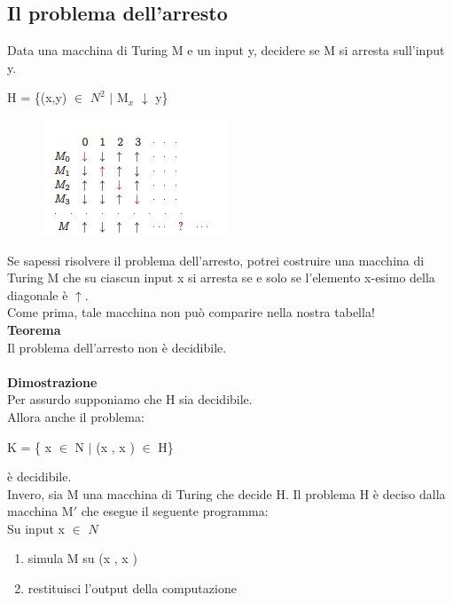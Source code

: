 \subsection{Il problema dell'arresto}
Data una macchina di Turing M e un input y, decidere se M si arresta sull’input y.\\
\begin{center}
    H = \{(x,y) $\in$ $N^2$ $|$ M$_x$ $\downarrow$ y\}
\end{center}
\begin{figure}[htp]
    \centering
    \includegraphics[scale=0.8]{tesi_stile/img/arresto.png}
\end{figure}
Se sapessi risolvere il problema dell’arresto, potrei costruire una macchina di Turing M che su ciascun input x si arresta se e solo se l’elemento x-esimo della diagonale è $\uparrow$.\\
Come prima, tale macchina non può comparire nella nostra tabella!\\
\textbf{Teorema}\\
Il problema dell’arresto non è decidibile.\\\\
\textbf{Dimostrazione}\\
Per assurdo supponiamo che H sia decidibile.\\
Allora anche il problema:
\begin{center}
    K = \{ x $\in$ N $|$ (x , x ) $\in$ H\}
\end{center}
è decidibile.\\
Invero, sia M una macchina di Turing che decide H. Il problema H è deciso dalla macchina M$'$ che esegue il seguente programma:\\
Su input x $\in$ $N$
\begin{center}
    \begin{enumerate}
        \item simula M su (x , x )
        
        \item restituisci l’output della computazione
    \end{enumerate}
\end{center}
